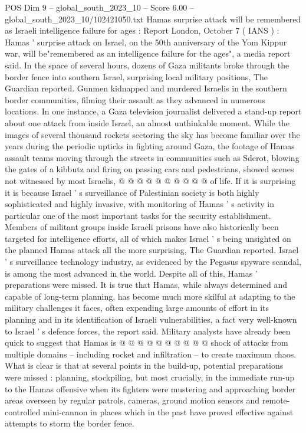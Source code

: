 \begin{textsample}{POS Dim 9 – global\_south\_2023\_10 – Score 6.00 – global\_south\_2023\_10/102421050.txt}  \label{ex:f9_pos_039}
Hamas surprise attack will be remembered as Israeli intelligence failure for ages : Report London, October 7 ( IANS ) : Hamas ' surprise attack on Israel, on the 50th anniversary of the Yom Kippur war, will be"remembered as an intelligence failure for the ages", a media report said.
In the space of several hours, dozens of Gaza militants broke through the border fence into southern Israel, surprising local military positions, The Guardian reported.
Gunmen kidnapped and murdered Israelis in the southern border communities, filming their assault as they advanced in numerous locations.
In one instance, a Gaza television journalist delivered a stand-up report about one attack from inside Israel, an almost unthinkable moment.
While the images of several thousand rockets sectoring the sky has become familiar over the years during the periodic upticks in fighting around Gaza, the footage of Hamas assault teams moving through the streets in communities such as Sderot, blowing the gates of a kibbutz and firing on passing cars and pedestrians, showed scenes not witnessed by most Israelis, @ @ @ @ @ @ @ @ @ @ of life.
If it is surprising it is because Israel ' s surveillance of Palestinian society is both highly sophisticated and highly invasive, with monitoring of Hamas ' s activity in particular one of the most important tasks for the security establishment.
Members of militant groups inside Israeli prisons have also historically been targeted for intelligence efforts, all of which makes Israel ' s being unsighted on the planned Hamas attack all the more surprising, The Guardian reported.
Israel ' s surveillance technology industry, as evidenced by the Pegasus spyware scandal, is among the most advanced in the world.
Despite all of this, Hamas ' preparations were missed.
It is true that Hamas, while always determined and capable of long-term planning, has become much more skilful at adapting to the military challenges it faces, often expending large amounts of effort in its planning and in its identification of Israeli vulnerabilities, a fact very well-known to Israel ' s defence forces, the report said.
Military analysts have already been quick to suggest that Hamas is @ @ @ @ @ @ @ @ @ @ shock of attacks from multiple domains -- including rocket and infiltration -- to create maximum chaos.
What is clear is that at several points in the build-up, potential preparations were missed : planning, stockpiling, but most crucially, in the immediate run-up to the Hamas offensive when its fighters were mustering and approaching border areas overseen by regular patrols, cameras, ground motion sensors and remote-controlled mini-cannon in places which in the past have proved effective against attempts to storm the border fence.

\end{textsample}
